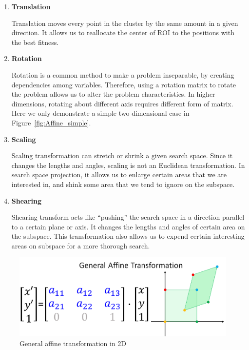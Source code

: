 \begin{enumerate}
    \item \textbf{Translation}

            Translation moves every point in the cluster by the same amount in a given direction.
            It allows us to reallocate the center of ROI to the positions with the best fitness.

    \item \textbf{Rotation}

            Rotation is a common method to make a problem inseparable, by creating dependencies among variables.
            Therefore, using a rotation matrix to rotate the problem allows us to alter the problem characteristics.
            In higher dimensions, rotating about different axis requires different form of matrix.
            Here we only demonstrate a simple two dimensional case in Figure~\ref{fig:Affine_simple}.

    \item \textbf{Scaling}

            Scaling transformation can stretch or shrink a given search space.
            Since it changes the lengths and angles, scaling is not an Euclidean transformation.
            In search space projection, it allows us to enlarge certain areas that we are interested in,
            and shink some area that we tend to ignore on the subspace.

    \item \textbf{Shearing}

            Shearing transform acts like ``pushing'' the search space in a direction parallel to a certain plane or axis.
            It changes the lengths and angles of certain area on the subspace.
            This transformation also allows us to expend certain interesting areas on subspace for a more thorough search.

\end{enumerate} 


\begin{figure}[H]
\centering
\includegraphics[width=\textwidth]{Affine}
\caption{General affine transformation in 2D}\label{fig:Affine}
\end{figure}

